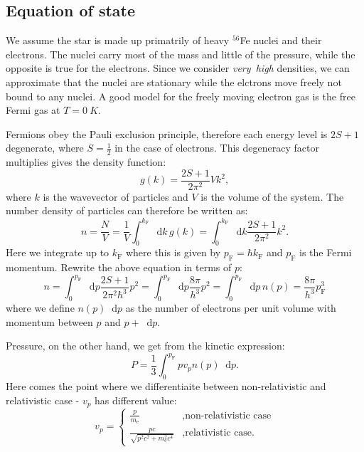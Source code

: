 \documentclass[]{article}
\newcommand{\dd}{\mathop{}\!\mathrm{d}}
\begin{document}
\subsection{Equation of state}
We assume the star is made up primatrily of heavy $^{56}$Fe nuclei and their electrons. The nuclei carry most of the mass and little of the pressure, while the opposite is true for the electrons. Since we consider \emph{very~high} densities, we can approximate that the nuclei are stationary while the elctrons move freely not bound to any nuclei. A good model for the freely moving electron gas is the free Fermi gas at $T = \SI{0}{K}$.

Fermions obey the Pauli exclusion principle, therefore each energy level is $2S + 1$ degenerate, where $S = \frac{1}{2}$ in the case of electrons. This degeneracy factor multiplies gives the density function:
\begin{equation}
	g(k) = \frac{2S + 1}{2 \pi^2} V k^2,
\end{equation}
where $k$ is the wavevector of particles and $V$ is the volume of the system. The number density of particles can therefore be written as:
\begin{equation}
	n = \frac{N}{V} = \frac{1}{V} \int_0^{k_\mathrm{F}} \dd k \, g(k) = \int_0^{k_\mathrm{F}} \dd k \frac{2S + 1}{2 \pi^2} k^2.
\end{equation}
Here we integrate up to $k_\mathrm{F}$ where this is given by $p_\mathrm{F} = \hbar k_\mathrm{F}$ and $p_\mathrm{F}$ is the Fermi momentum. Rewrite the above equation in terms of $p$:
\begin{equation}\label{eqn:number-density}
	n = \int_0^{p_\mathrm{F}} \dd p \frac{2S + 1}{2 \pi^2 \hbar^3} p^2 = \int_0^{p_\mathrm{F}} \dd p \frac{8 \pi}{h^3} p^2 = \int_0^{p_\mathrm{F}} \dd p \, n(p) = \frac{8 \pi}{h^3} p_\mathrm{F}^3
\end{equation}
where we define $n(p) \dd p$ as the number of electrons per unit volume with momentum between $p$ and $p + \dd p$.

Pressure, on the other hand, we get from the kinetic expression:
\begin{equation}\label{eqn:pressure-int}
	P = \frac{1}{3} \int_0^{p_\mathrm{F}} p v_p n(p) \dd p.
\end{equation}
Here comes the point where we differentiaite between non-relativistic and relativistic case - $v_p$ has different value:
\begin{equation}
	v_p = \begin{cases}
		\frac{p}{m_\mathrm{e}} &, \text{non-relativistic case} \\
		\frac{pc}{\sqrt{p^2c^2 + m_\mathrm{e}^2 c^4}} &, \text{relativistic case.}
	\end{cases}
\end{equation}
\end{document}
